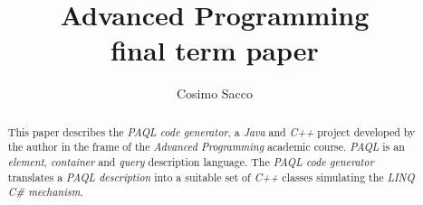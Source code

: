 \documentclass[10pt]{article}  %
\begin{document}
\title{Advanced Programming\\final term paper}   %
\author{Cosimo Sacco}         %
\date{}    %
\maketitle
\begin{abstract}
    This paper describes the \emph{PAQL code generator}, a \emph{Java} and \emph{C++} project
    developed by the author in the frame of the
    \emph{Advanced Programming} academic course. \emph{PAQL} is an \emph{element}, \emph{container} and
    \emph{query} description language. The \emph{PAQL code generator} translates
    a \emph{PAQL description} into a suitable set of \emph{C++} classes simulating the \emph{LINQ C\# mechanism}.
\end{abstract}
\end{document}
